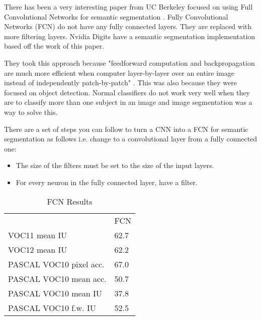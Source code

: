 There has been a very interesting paper from UC Berkeley focused on using Full Convolutional
Networks for semantic segmentation \parencite{fcn}. Fully Convolutional Networks
(FCN)
do not have any fully connected layers. They are replaced with more filtering
layers. Nvidia Digits have a semantic segmentation implementation based off the
work of this paper.

They took this approach because "feedforward computation and backpropagation are
much more efficient when computer layer-by-layer over an entire image instead of
independently patch-by-patch" \parencite{fcn}. This was also because they
were focused on object detection. Normal classifiers do not work very well when
they are to classify more than one subject in an image and image segmentation
was a way to solve this.

There are a set of steps you can follow to turn a CNN into a FCN for semantic
segmentation as follows i.e. change to a convolutional layer from a fully
connected one:
\begin{itemize}
    \item{The size of the filters must be set to the size of the input layers.}
    \item{For every neuron in the fully connected layer, have a filter.}
\end{itemize}

\begin{table}[]
\centering
\caption{FCN Results \parencite{fcn}}
\label{fcn}
\begin{tabular}{ll}
                        & FCN  \\
VOC11 mean IU           & 62.7 \\
VOC12 mean IU           & 62.2 \\
PASCAL VOC10 pixel acc. & 67.0 \\
PASCAL VOC10 mean acc.  & 50.7 \\
PASCAL VOC10 mean IU    & 37.8 \\
PASCAL VOC10 f.w. IU    & 52.5
\end{tabular}
\end{table}
